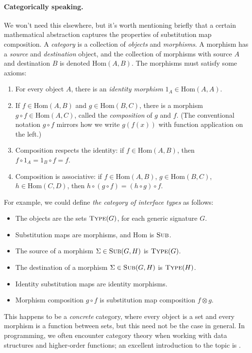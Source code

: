\documentclass[../generics]{subfiles}
\begin{document}
\paragraph{Categorically speaking.}
We won't need this elsewhere, but it's worth mentioning briefly that a certain mathematical abstraction captures the properties of substitution map composition. A \emph{category} is a collection of \emph{objects} and \emph{morphisms}. A morphism has a \emph{source} and \emph{destination} object, and the collection of morphisms with source $A$ and destination $B$ is denoted $\mathrm{Hom}(A,B)$. The morphisms must satisfy some axioms:
\begin{enumerate}
\item For every object $A$, there is an \emph{identity morphism} $1_A\in\mathrm{Hom}(A, A)$.
\item If $f\in\mathrm{Hom}(A, B)$ and $g\in\mathrm{Hom}(B, C)$, there is a morphism $g\circ f\in\mathrm{Hom}(A,C)$, called the \emph{composition} of $g$ and $f$. (The conventional notation $g\circ f$ mirrors how we write $g(f(x))$ with function application on the left.)
\item Composition respects the identity: if $f\in\mathrm{Hom}(A, B)$, then $f\circ 1_A=1_B\circ f=f$.
\item Composition is associative: if $f\in\mathrm{Hom}(A, B)$, $g\in\mathrm{Hom}(B, C)$, $h\in\mathrm{Hom}(C, D)$, then $h\circ(g\circ f)=(h\circ g)\circ f$.
\end{enumerate}
For example, we could define \emph{the category of interface types} as follows:
\begin{itemize}
\item The objects are the sets $\textsc{Type}({G})$, for each generic signature $G$.
\item Substitution maps are morphisms, and $\mathrm{Hom}$ is $\textsc{Sub}$.
\item The source of a morphism $\Sigma\in\textsc{Sub}({G, H})$ is $\textsc{Type}({G})$.
\item The destination of a morphism $\Sigma\in\textsc{Sub}({G, H})$ is $\textsc{Type}({H})$.
\item Identity substitution maps are identity morphisms.
\item Morphism composition $g \circ f$ is substitution map composition $f\otimes g$.
\end{itemize}
This happens to be a \emph{concrete} category, where every object is a set and every morphism is a function between sets, but this need not be the case in general. In programming, we often encounter category theory when working with data structures and higher-order functions; an excellent introduction to the topic is \cite{catprogrammer}.
\end{document}
